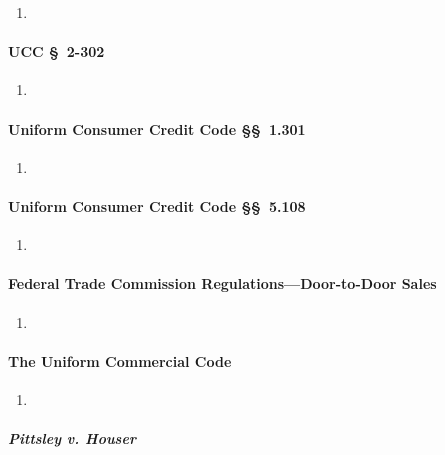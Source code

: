 \begin{enumerate}
    \item %
\end{enumerate}

\paragraph{UCC \S\ 2-302}

\begin{enumerate}
    \item %
\end{enumerate}

\paragraph{Uniform Consumer Credit Code \S\S\ 1.301}

\begin{enumerate}
    \item %
\end{enumerate}

\paragraph{Uniform Consumer Credit Code \S\S\ 5.108}

\begin{enumerate}
    \item %
\end{enumerate}

\paragraph{Federal Trade Commission Regulations---Door-to-Door Sales}

\begin{enumerate}
    \item %
\end{enumerate}

\paragraph{The Uniform Commercial Code}

\begin{enumerate}
    \item %
\end{enumerate}

\paragraph{\emph{Pittsley v. Houser}}

